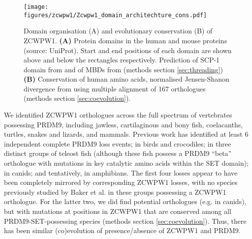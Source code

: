 \begin{figure}[H]
	\centering
	\texttt{[image: figures/zcwpw1/Zcwpw1\_domain\_architechture\_cons.pdf]}
	\caption[Zcwpw1 Domains and Conservation]{
		Domain organisation (A) and evolutionary conservation (B) of ZCWPW1.
		\textbf{(A)} Protein domains in the human and mouse proteins (source: UniProt).
			Start and end positions of each domain are shown above and below the rectangles respectively.
			Prediction of SCP-1 domain from \parencite{Marchler-Bauer2004CDSearch} and of MBDs from \parencite{Lobley2009pGenTHREADER} (methods section \ref{sec:threading})
		\textbf{(B)} Conservation of human amino acids, normalised Jensen-Shanon divergence from \parencite{Capra2007Predicting, Johansson2010comparative} using multiple alignment of 167 orthologues (methods section \ref{sec:coevolution}).
	}
	\label{fig:domains}
\end{figure}


We identified ZCWPW1 orthologues across the full spectrum of vertebrates possessing PRDM9, including jawless, cartilaginous and bony fish, coelacanths, turtles, snakes and lizards, and mammals.
Previous work \parencite{Baker2017Repeated} has identified at least 6 independent complete PRDM9 loss events; in birds and crocodiles; in three distinct groups of teleost fish (although these fish possess a PRDM9 “beta” orthologue with mutations in key catalytic amino acids within the SET domain); in canids; and tentatively, in amphibians.
The first four losses appear to have been completely mirrored by corresponding ZCWPW1 losses, with no species previously studied by Baker et al. in these groups possessing a ZCWPW1 orthologue.
For the latter two, we did find potential orthologues (e.g. in canids), but with mutations at positions in ZCWPW1 that are conserved among all PRDM9-SET-possessing species (methods section \ref{sec:coevolution}).
Thus, there has been similar (co)evolution of presence/absence of ZCWPW1 and PRDM9.

